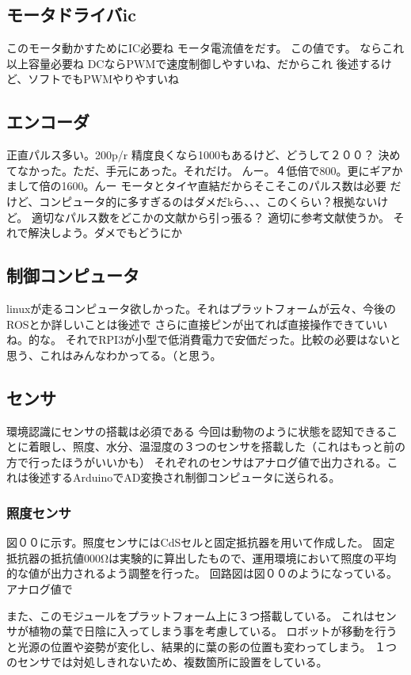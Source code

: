 \subsection{モータドライバic}
このモータ動かすためにIC必要ね
モータ電流値をだす。
この値です。
ならこれ以上容量必要ね
DCならPWMで速度制御しやすいね、だからこれ
後述するけど、ソフトでもPWMやりやすいね
\subsection{エンコーダ}
正直パルス多い。200p/r
精度良くなら1000もあるけど、どうして２００？
決めてなかった。ただ、手元にあった。それだけ。
んー。４低倍で800。更にギアかまして倍の1600。んー
モータとタイヤ直結だからそこそこのパルス数は必要
だけど、コンピュータ的に多すぎるのはダメだkら、、、このくらい？根拠ないけど。
適切なパルス数をどこかの文献から引っ張る？
適切に参考文献使うか。
それで解決しよう。ダメでもどうにか
\subsection{制御コンピュータ}
linuxが走るコンピュータ欲しかった。それはプラットフォームが云々、今後のROSとか詳しいことは後述で
さらに直接ピンが出てれば直接操作できていいね。的な。
それでRPI3が小型で低消費電力で安価だった。比較の必要はないと思う、これはみんなわかってる。（と思う。
\subsection{センサ}
環境認識にセンサの搭載は必須である
今回は動物のように状態を認知できることに着眼し、照度、水分、温湿度の３つのセンサを搭載した（これはもっと前の方で行ったほうがいいかも）
それぞれのセンサはアナログ値で出力される。これは後述するArduinoでAD変換され制御コンピュータに送られる。
\subsubsection{照度センサ}
図００に示す。照度センサにはCdSセルと固定抵抗器を用いて作成した。
固定抵抗器の抵抗値000Ωは実験的に算出したもので、運用環境において照度の平均的な値が出力されるよう調整を行った。
回路図は図００のようになっている。
アナログ値で
\par また、このモジュールをプラットフォーム上に３つ搭載している。
これはセンサが植物の葉で日陰に入ってしまう事を考慮している。
ロボットが移動を行うと光源の位置や姿勢が変化し、結果的に葉の影の位置も変わってしまう。
１つのセンサでは対処しきれないため、複数箇所に設置をしている。

